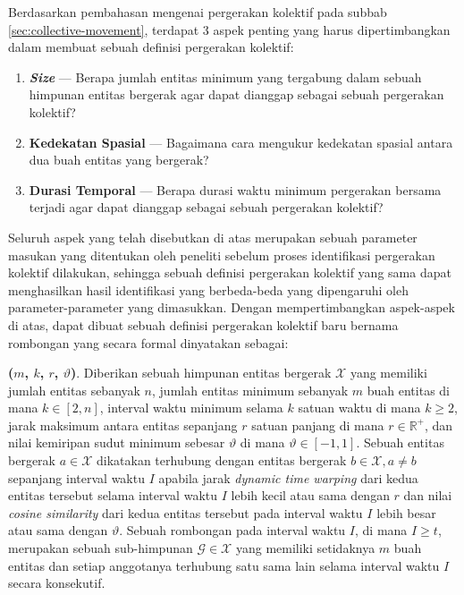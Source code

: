 Berdasarkan pembahasan mengenai pergerakan kolektif pada subbab \ref{sec:collective-movement}, terdapat 3 aspek penting yang harus dipertimbangkan dalam membuat sebuah definisi pergerakan kolektif:

\begin{enumerate}
    \item \textbf{\textit{Size}} --- Berapa jumlah entitas minimum yang tergabung dalam sebuah himpunan entitas bergerak agar dapat dianggap sebagai sebuah pergerakan kolektif?
    \item \textbf{Kedekatan Spasial} --- Bagaimana cara mengukur kedekatan spasial antara dua buah entitas yang bergerak?
    \item \textbf{Durasi Temporal} --- Berapa durasi waktu minimum pergerakan bersama terjadi agar dapat dianggap sebagai sebuah pergerakan kolektif?
\end{enumerate}

Seluruh aspek yang telah disebutkan di atas merupakan sebuah parameter masukan yang ditentukan oleh peneliti sebelum proses identifikasi pergerakan kolektif dilakukan, sehingga sebuah definisi pergerakan kolektif yang sama dapat menghasilkan hasil identifikasi yang berbeda-beda yang dipengaruhi oleh parameter-parameter yang dimasukkan. 
Dengan mempertimbangkan aspek-aspek di atas, dapat dibuat sebuah definisi pergerakan kolektif baru bernama rombongan yang secara formal dinyatakan sebagai:

\noindent \textbf{\pergerakankolektif($m$, $k$, $r$, $\vartheta$)}. Diberikan sebuah himpunan entitas bergerak $\mathcal{X}$ yang memiliki jumlah entitas sebanyak $n$, jumlah entitas minimum sebanyak $m$ buah entitas di mana $k \in [2, n]$, interval waktu minimum selama $k$ satuan waktu di mana $k \geq 2$, jarak maksimum antara entitas sepanjang $r$ satuan panjang di mana $r \in \mathbb{R}^+$, dan nilai kemiripan sudut minimum sebesar $\vartheta$ di mana $\vartheta \in [-1, 1]$. Sebuah entitas bergerak $a \in \mathcal{X}$ dikatakan terhubung dengan entitas bergerak $b \in \mathcal{X}, a \neq b$ sepanjang interval waktu $I$ apabila jarak \textit{dynamic time warping} dari kedua entitas tersebut selama interval waktu $I$ lebih kecil atau sama dengan $r$ dan nilai \textit{cosine similarity} dari kedua entitas tersebut pada interval waktu $I$ lebih besar atau sama dengan $\vartheta$. Sebuah rombongan pada interval waktu $I$, di mana $I \geq t$, merupakan sebuah sub-himpunan $\mathcal{G} \in \mathcal{X}$ yang memiliki setidaknya $m$ buah entitas dan setiap anggotanya terhubung satu sama lain selama interval waktu $I$ secara konsekutif. 

